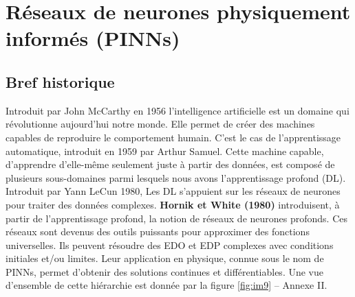 \documentclass[12pt, oneside]{report} %
\theoremstyle{definition}
\theoremstyle{remark}
\begin{document}

\section{Réseaux de neurones physiquement informés (PINNs)}

		\subsection*{ Bref historique}
	Introduit par John McCarthy en 1956 l'intelligence artificielle est un domaine qui révolutionne aujourd'hui notre monde. Elle permet de créer des machines capables de reproduire le comportement humain. C'est le cas de l'apprentissage automatique, introduit en 1959 par Arthur Samuel. Cette machine capable, d'apprendre d'elle-même seulement juste à partir des données, est composé de plusieurs sous-domaines parmi lesquels nous avons l'apprentissage profond (DL). Introduit par Yann LeCun 1980, Les DL s'appuient sur les réseaux de neurones pour traiter des données complexes. \textbf{Hornik et White (1980)} introduisent, à partir de l'apprentissage profond, la notion de réseaux de neurones profonds.  
	Ces réseaux sont devenus des outils puissants pour approximer des fonctions universelles.  
	Ils peuvent résoudre des EDO et EDP complexes avec conditions initiales et/ou limites.  
	Leur application en physique, connue sous le nom de PINNs, permet d’obtenir des solutions continues et différentiables.  
	Une vue d'ensemble de cette hiérarchie est donnée par la figure \eqref{fig:im9} -- Annexe II.
				
\end{document}
